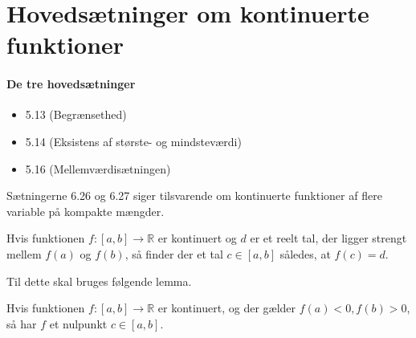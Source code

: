 \chapter{Hovedsætninger om kontinuerte funktioner}
\subsubsection{De tre hovedsætninger}
\begin{itemize}
\setlength\itemsep{0em}
\item 5.13 (Begrænsethed)
\item 5.14 (Eksistens af største- og mindsteværdi)
\item 5.16 (Mellemværdisætningen)
\end{itemize}
Sætningerne 6.26 og 6.27 siger tilsvarende om kontinuerte funktioner af flere variable på kompakte mængder.
\clearpage
\begin{theorem}[Mellemværdisætningen]
Hvis funktionen $f:[a,b]\to\mathbb{R}$ er kontinuert og $d$ er et reelt tal, der ligger strengt mellem $f(a)$ og $f(b)$, så finder der et tal $c\in[a,b]$ således, at $f(c)=d$.
\end{theorem}
Til dette skal bruges følgende lemma.
\begin{lemma}
Hvis funktionen $f:[a,b]\to\mathbb{R}$ er kontinuert, og der gælder $f(a)<0, f(b)>0$, så har $f$ et nulpunkt $c\in[a,b]$.
\end{lemma}
